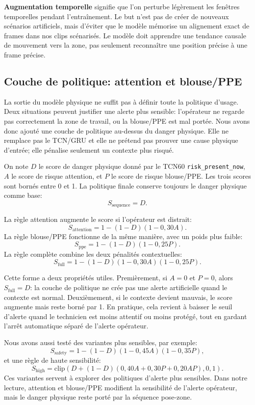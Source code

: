 \documentclass[11pt]{article}
\begin{document}
\textbf{Augmentation temporelle} signifie que l'on perturbe légèrement les fenêtres temporelles pendant l'entraînement. Le but n'est pas de créer de nouveaux scénarios artificiels, mais d'éviter que le modèle mémorise un alignement exact de frames dans nos clips scénarisés. Le modèle doit apprendre une tendance causale de mouvement vers la zone, pas seulement reconnaître une position précise à une frame précise.

\subsection{Couche de politique: attention et blouse/PPE}
La sortie du modèle physique ne suffit pas à définir toute la politique d'usage. Deux situations peuvent justifier une alerte plus sensible: l'opérateur ne regarde pas correctement la zone de travail, ou la blouse/PPE est mal portée. Nous avons donc ajouté une couche de politique au-dessus du danger physique. Elle ne remplace pas le TCN/GRU et elle ne prétend pas prouver une cause physique d'entrée; elle pénalise seulement un contexte plus risqué.

On note $D$ le score de danger physique donné par le TCN60 \texttt{risk\_present\_now}, $A$ le score de risque attention, et $P$ le score de risque blouse/PPE. Les trois scores sont bornés entre 0 et 1. La politique finale conserve toujours le danger physique comme base:
\[
S_{\mathrm{sequence}} = D.
\]

La règle attention augmente le score si l'opérateur est distrait:
\[
S_{\mathrm{attention}} = 1 - (1-D)(1-0,30A).
\]
La règle blouse/PPE fonctionne de la même manière, avec un poids plus faible:
\[
S_{\mathrm{ppe}} = 1 - (1-D)(1-0,25P).
\]
La règle complète combine les deux pénalités contextuelles:
\[
S_{\mathrm{full}} = 1 - (1-D)(1-0,30A)(1-0,25P).
\]

Cette forme a deux propriétés utiles. Premièrement, si $A=0$ et $P=0$, alors $S_{\mathrm{full}}=D$: la couche de politique ne crée pas une alerte artificielle quand le contexte est normal. Deuxièmement, si le contexte devient mauvais, le score augmente mais reste borné par 1. En pratique, cela revient à baisser le seuil d'alerte quand le technicien est moins attentif ou moins protégé, tout en gardant l'arrêt automatique séparé de l'alerte opérateur.

Nous avons aussi testé des variantes plus sensibles, par exemple:
\[
S_{\mathrm{safety}} = 1 - (1-D)(1-0,45A)(1-0,35P),
\]
et une règle de haute sensibilité:
\[
S_{\mathrm{high}} = \mathrm{clip}\left(D + (1-D)(0,40A + 0,30P + 0,20AP), 0, 1\right).
\]
Ces variantes servent à explorer des politiques d'alerte plus sensibles. Dans notre lecture, attention et blouse/PPE modifient la sensibilité de l'alerte opérateur, mais le danger physique reste porté par la séquence pose-zone.
\end{document}
